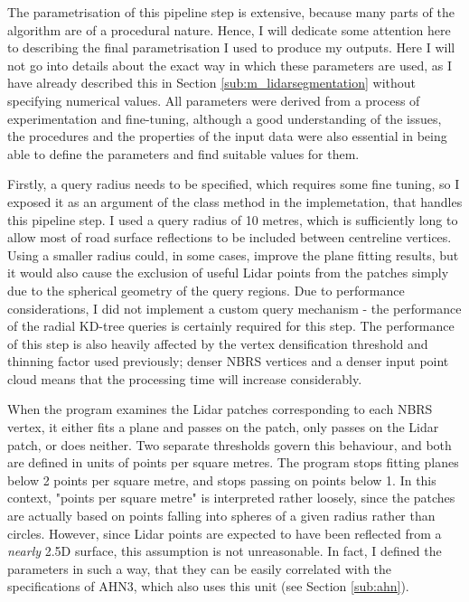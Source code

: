 The parametrisation of this pipeline step is extensive, because many parts of the algorithm are of a procedural nature. Hence, I will dedicate some attention here to describing the final parametrisation I used to produce my outputs. Here I will not go into details about the exact way in which these parameters are used, as I have already described this in Section \ref{sub:m_lidarsegmentation} without specifying numerical values. All parameters were derived from a process of experimentation and fine-tuning, although a good understanding of the issues, the procedures and the properties of the input data were also essential in being able to define the parameters and find suitable values for them.

Firstly, a query radius needs to be specified, which requires some fine tuning, so I exposed it as an argument of the class method in the implemetation, that handles this pipeline step. I used a query radius of 10 metres, which is sufficiently long to allow most of road surface reflections to be included between centreline vertices. Using a smaller radius could, in some cases, improve the plane fitting results, but it would also cause the exclusion of useful Lidar points from the patches simply due to the spherical geometry of the query regions. Due to performance considerations, I did not implement a custom query mechanism - the performance of the radial KD-tree queries is certainly required for this step. The performance of this step is also heavily affected by the vertex densification threshold and thinning factor used previously; denser NBRS vertices and a denser input point cloud means that the processing time will increase considerably.

When the program examines the Lidar patches corresponding to each NBRS vertex, it either fits a plane and passes on the patch, only passes on the Lidar patch, or does neither. Two separate thresholds govern this behaviour, and both are defined in units of points per square metres. The program stops fitting planes below 2 points per square metre, and stops passing on points below 1. In this context, "points per square metre" is interpreted rather loosely, since the patches are actually based on points falling into spheres of a given radius rather than circles. However, since Lidar points are expected to have been reflected from a \textit{nearly} 2.5D surface, this assumption is not unreasonable. In fact, I defined the parameters in such a way, that they can be easily correlated with the specifications of AHN3, which also uses this unit (see Section \ref{sub:ahn}).

